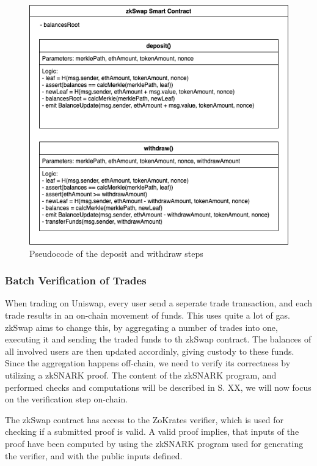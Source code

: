 \documentclass[../../thesis.tex]{subfiles}
\begin{document}
\begin{figure}[h]
    \centerline{\includegraphics[totalheight=8cm]{diagrams/deposit.png}}
    \caption{Pseudocode of the deposit and withdraw steps}
    \label{fig:dep_with}
\end{figure}


\subsubsection{Batch Verification of Trades}
When trading on Uniswap, every user send a seperate trade transaction, and each trade results in an on-chain movement of funds. This uses quite a lot of gas. zkSwap aims to change this, by aggregating a number of trades into one, executing it and sending the traded funds to th zkSwap contract. The balances of all involved users are then updated accordinly, giving custody to these funds. Since the aggregation happens off-chain, we need to verify its correctness by utilizing a zkSNARK proof. The content of the zkSNARK program, and performed checks and computations will be described in S. XX, we will now focus on the verification step on-chain. 

The zkSwap contract has access to the ZoKrates verifier, which is used for checking if a submitted proof is valid. A valid proof implies, that inputs of the proof have been computed by using the zkSNARK program used for generating the verifier, and with the public inputs defined.  
\end{document}
